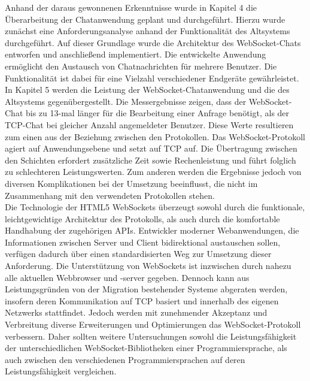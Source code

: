 \documentclass[11pt,a4paper,titlepage]{scrartcl}
\numberwithin{equation}{section}
\begin{document}
\noindent Anhand der daraus gewonnenen Erkenntnisse wurde in Kapitel 4 die Überarbeitung der Chatanwendung geplant und durchgeführt. Hierzu wurde zunächst eine Anforderungsanalyse anhand der Funktionalität des Altsystems durchgeführt. Auf dieser Grundlage wurde die Architektur des WebSocket-Chats entworfen und anschließend implementiert. Die entwickelte Anwendung ermöglicht den Austausch von Chatnachrichten für mehrere Benutzer. Die Funktionalität ist dabei für eine Vielzahl verschiedener Endgeräte gewährleistet. In Kapitel 5 werden die Leistung der WebSocket-Chatanwendung und die des Altsystems gegenübergestellt. Die Messergebnisse zeigen, dass der WebSocket-Chat bis zu 13-mal länger für die Bearbeitung einer Anfrage benötigt, als der TCP-Chat bei gleicher Anzahl angemeldeter Benutzer. Diese Werte resultieren zum einen aus der Beziehung zwischen den Protokollen. Das WebSocket-Protokoll agiert auf Anwendungsebene und setzt auf TCP auf. Die Übertragung zwischen den Schichten erfordert zusätzliche Zeit sowie Rechenleistung und führt folglich zu schlechteren Leistungswerten. Zum anderen werden die Ergebnisse jedoch von diversen Komplikationen bei der Umsetzung beeinflusst, die nicht im Zusammenhang mit den verwendeten Protokollen stehen. \\

\noindent Die Technologie der HTML5 WebSockets überzeugt sowohl durch die funktionale, leichtgewichtige Architektur des Protokolls, als auch durch die komfortable Handhabung der zugehörigen APIs. Entwickler moderner Webanwendungen, die Informationen zwischen Server und Client bidirektional austauschen sollen, verfügen dadurch über einen standardisierten Weg zur Umsetzung dieser Anforderung. Die Unterstützung von WebSockets ist inzwischen durch nahezu alle aktuellen Webbrowser und -server gegeben. Dennoch kann aus Leistungsgründen von der Migration bestehender Systeme abgeraten werden, insofern deren Kommunikation auf TCP basiert und innerhalb des eigenen Netzwerks stattfindet. Jedoch werden mit zunehmender Akzeptanz und Verbreitung diverse Erweiterungen und Optimierungen das WebSocket-Protokoll verbessern. Daher sollten weitere Untersuchungen sowohl die Leistungsfähigkeit der unterschiedlichen WebSocket-Bibliotheken einer Programmiersprache, als auch zwischen den verschiedenen Programmiersprachen auf deren Leistungsfähigkeit vergleichen. 

\newpage
\appendix
{}
\printbibliography
\newpage
\listoffigures
\newpage
\listoftables
\newpage
\lstlistoflistings
\newpage
\end{document}
